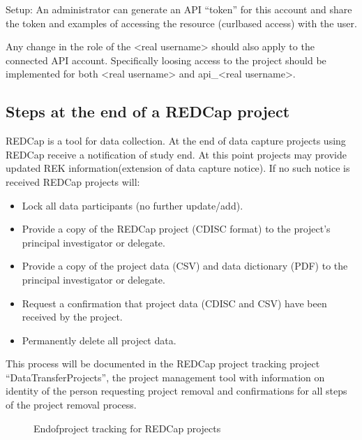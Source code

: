 \documentclass[letterpaper,10pt,english]{sphinxmanual}
\begin{document}
\sphinxAtStartPar
Setup: An administrator can generate an API “token” for this account and share the token and examples of accessing the resource (curl\sphinxhyphen{}based access) with the user.

\sphinxAtStartPar
Any change in the role of the \textless{}real username\textgreater{} should also apply to the connected API account. Specifically loosing access to the project should be implemented for both \textless{}real username\textgreater{} and api\_\textless{}real username\textgreater{}.


\subsection{Steps at the end of a REDCap project}
\label{\detokenize{ServerAdmin/admin:steps-at-the-end-of-a-redcap-project}}
\sphinxAtStartPar
REDCap is a tool for data collection. At the end of data capture projects using REDCap receive a notification of study end. At this point projects may provide updated REK information(extension of data capture notice). If no such notice is received REDCap projects will:
\begin{itemize}
\item {} 
\sphinxAtStartPar
Lock all data participants (no further update/add).

\item {} 
\sphinxAtStartPar
Provide a copy of the REDCap project (CDISC format) to the project’s principal investigator or delegate.

\item {} 
\sphinxAtStartPar
Provide a copy of the project data (CSV) and data dictionary (PDF) to the principal investigator or delegate.

\item {} 
\sphinxAtStartPar
Request a confirmation that project data (CDISC and CSV) have been received by the project.

\item {} 
\sphinxAtStartPar
Permanently delete all project data.

\end{itemize}

\sphinxAtStartPar
This process will be documented in the REDCap project tracking project “DataTransferProjects”, the project management tool with information on identity of the person requesting project removal and confirmations for all steps of the project removal process.

\begin{figure}[htbp]
\centering
\capstart

\noindent{}
\caption{End\sphinxhyphen{}of\sphinxhyphen{}project tracking for REDCap projects}\label{\detokenize{ServerAdmin/admin:id2}}\end{figure}
\end{document}
